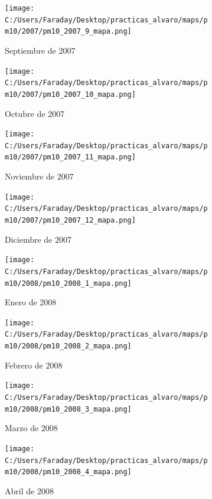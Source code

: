 \documentclass[12pt]{article}
\begin{document}
\begin{figure}[H]
\centering
\begin{subfigure}[h]{0.45\textwidth}
\texttt{[image: C:/Users/Faraday/Desktop/practicas\_alvaro/maps/pm10/2007/pm10\_2007\_9\_mapa.png]}
\caption{Septiembre de 2007}
\label{fig:map-mon-3-9-2007}
\end{subfigure}
%
\begin{subfigure}[H]{0.45\textwidth}
\texttt{[image: C:/Users/Faraday/Desktop/practicas\_alvaro/maps/pm10/2007/pm10\_2007\_10\_mapa.png]}
\caption{Octubre de 2007}
\label{fig:map-mon-3-10-2007}
\end{subfigure}
\caption{}
\end{figure}

\begin{figure}[H]
\centering
\begin{subfigure}[h]{0.45\textwidth}
\texttt{[image: C:/Users/Faraday/Desktop/practicas\_alvaro/maps/pm10/2007/pm10\_2007\_11\_mapa.png]}
\caption{Noviembre de 2007}
\label{fig:map-mon-3-11-2007}
\end{subfigure}
%
\begin{subfigure}[H]{0.45\textwidth}
\texttt{[image: C:/Users/Faraday/Desktop/practicas\_alvaro/maps/pm10/2007/pm10\_2007\_12\_mapa.png]}
\caption{Diciembre de 2007}
\label{fig:map-mon-3-12-2007}
\end{subfigure}
\caption{}
\end{figure}

\newpage

\begin{figure}[H]
\centering
\begin{subfigure}[h]{0.45\textwidth}
\texttt{[image: C:/Users/Faraday/Desktop/practicas\_alvaro/maps/pm10/2008/pm10\_2008\_1\_mapa.png]}
\caption{Enero de 2008}
\label{fig:map-mon-3-1-2008}
\end{subfigure}
%
\begin{subfigure}[H]{0.45\textwidth}
\texttt{[image: C:/Users/Faraday/Desktop/practicas\_alvaro/maps/pm10/2008/pm10\_2008\_2\_mapa.png]}
\caption{Febrero de 2008}
\label{fig:map-mon-3-2-2008}
\end{subfigure}
\caption{}
\end{figure}

\begin{figure}[H]
\centering
\begin{subfigure}[h]{0.45\textwidth}
\texttt{[image: C:/Users/Faraday/Desktop/practicas\_alvaro/maps/pm10/2008/pm10\_2008\_3\_mapa.png]}
\caption{Marzo de 2008}
\label{fig:map-mon-3-3-2008}
\end{subfigure}
%
\begin{subfigure}[H]{0.45\textwidth}
\texttt{[image: C:/Users/Faraday/Desktop/practicas\_alvaro/maps/pm10/2008/pm10\_2008\_4\_mapa.png]}
\caption{Abril de 2008}
\label{fig:map-mon-3-4-2008}
\end{subfigure}
\caption{}
\end{figure}
\end{document}
